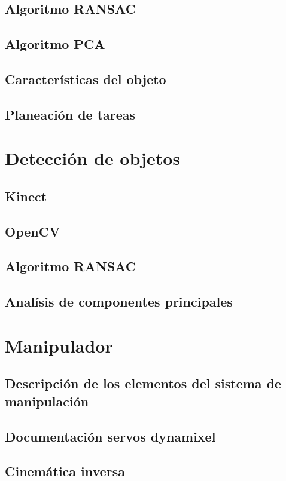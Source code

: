 \documentclass[a4paper, openright, 12pt]{report}
\begin{document}
	\section{Algoritmo RANSAC}
	\section{Algoritmo PCA}
	\section{Características del objeto}


	\section{Planeación de tareas}



\chapter{Detección de objetos}
	\section{Kinect}
	\section{OpenCV}
	\section{Algoritmo RANSAC}
	\section{Analísis de componentes principales}


\chapter{Manipulador}
	\section{Descripción de los elementos del sistema de manipulación}
	\section{Documentación servos dynamixel}
	\section{Cinemática inversa}
\end{document}
